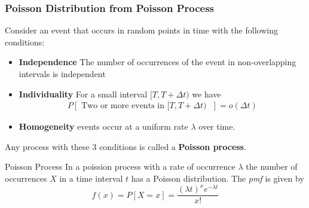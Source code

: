 \documentclass[16pt,a4paper]{article}
\begin{document}
\subsubsection{Poisson Distribution from Poisson Process}
Consider an event that occurs in random points in time with the following conditions: 
\begin{itemize}
    \item \textbf{Independence} The number of occurrences of the event in non-overlapping intervals is independent
    \item \textbf{Individuality} For a small interval $[T, T+\Delta t)$ we have 
        \begin{align*}
            P[\text{ Two or more events in $[T, T+\Delta t)$ } ] = o(\Delta t)
        \end{align*}
    \item \textbf{Homogeneity} events occur at a uniform rate $\lambda$ over time. 
\end{itemize}
Any process with these 3 conditions is called a \textbf{Poisson process}. 
\begin{thm}{Poisson Process}
    In a poission process with a rate of occurrence $\lambda$ the number of occurrences $X$ in a time interval $t$ has a Poisson distribution. The \textit{pmf} is given by 
    \[
        f(x) = P[X=x] = \frac{(\lambda t)^x e^{-\lambda t}}{x!}
    \]
\end{thm}
\newpage
\end{document}

